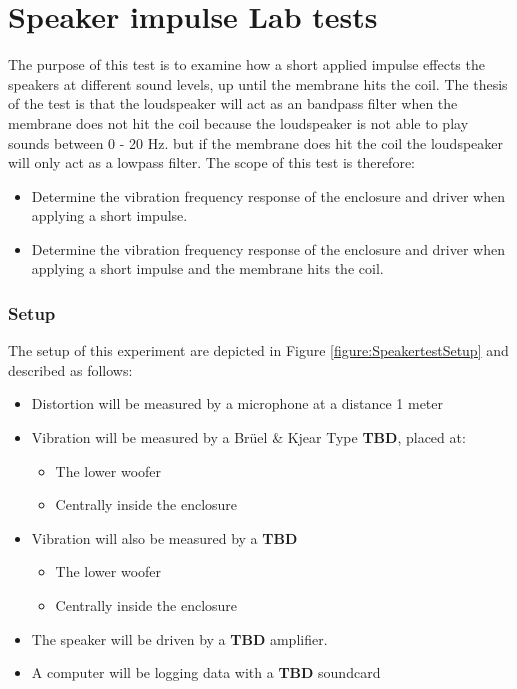 \chapter{Speaker impulse Lab tests} \label{app:journal_speaker_test}

The purpose of this test is to examine how a short applied impulse effects the speakers at different sound levels, up until the membrane hits the coil. The thesis of the test is that the loudspeaker will act as an bandpass filter when the membrane does not hit the coil because the loudspeaker is not able to play sounds between 0 - 20 Hz. but if the membrane does hit the coil the loudspeaker will only act as a lowpass filter. The scope of this test is therefore:



\begin{itemize}
\item Determine the vibration frequency response of the enclosure and driver when applying a short impulse.
\item Determine the vibration frequency response of the enclosure and driver when applying a short impulse and the membrane hits the coil.
\end{itemize}

\subsection{Setup}

The setup of this experiment are depicted in Figure \ref{figure:SpeakertestSetup} and described as follows:
\begin{itemize}
\item Distortion will be measured by a microphone at a distance 1 meter
\item Vibration will be measured by a Brüel \& Kjear Type \textbf{TBD}, placed at:
	\begin{itemize}
	\item The lower woofer
	\item Centrally inside the enclosure 
	\end{itemize}
\item Vibration will also be measured by a \textbf{TBD}
	\begin{itemize}
	\item The lower woofer
	\item Centrally inside the enclosure 
	\end{itemize}
\item The speaker will be driven by a \textbf{TBD} amplifier.
\item A computer will be logging data with a \textbf{TBD} soundcard
\end{itemize}

